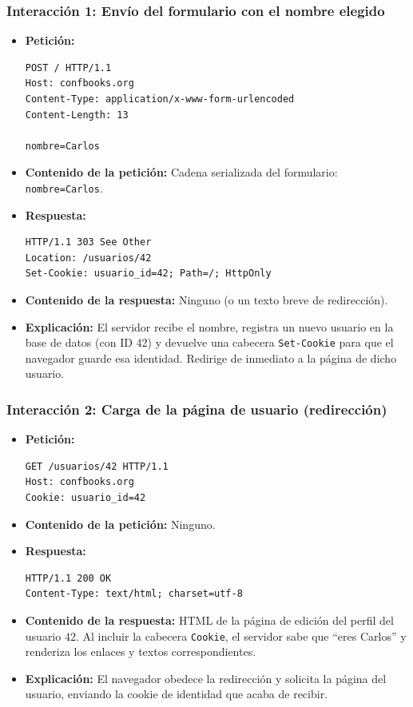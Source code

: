 \subsubsection*{Interacción 1: Envío del formulario con el nombre elegido}
\begin{itemize}
    \item \textbf{Petición:}
    \begin{verbatim}
POST / HTTP/1.1
Host: confbooks.org
Content-Type: application/x-www-form-urlencoded
Content-Length: 13

nombre=Carlos
    \end{verbatim}
    \item \textbf{Contenido de la petición:} Cadena serializada del formulario: \texttt{nombre=Carlos}.
    \item \textbf{Respuesta:}
    \begin{verbatim}
HTTP/1.1 303 See Other
Location: /usuarios/42
Set-Cookie: usuario_id=42; Path=/; HttpOnly
    \end{verbatim}
    \item \textbf{Contenido de la respuesta:} Ninguno (o un texto breve de redirección).
    \item \textbf{Explicación:} El servidor recibe el nombre, registra un nuevo usuario en la base de datos (con ID 42) y devuelve una cabecera \texttt{Set-Cookie} para que el navegador guarde esa identidad. Redirige de inmediato a la página de dicho usuario.
\end{itemize}

\subsubsection*{Interacción 2: Carga de la página de usuario (redirección)}
\begin{itemize}
    \item \textbf{Petición:}
    \begin{verbatim}
GET /usuarios/42 HTTP/1.1
Host: confbooks.org
Cookie: usuario_id=42
    \end{verbatim}
    \item \textbf{Contenido de la petición:} Ninguno.
    \item \textbf{Respuesta:}
    \begin{verbatim}
HTTP/1.1 200 OK
Content-Type: text/html; charset=utf-8
    \end{verbatim}
    \item \textbf{Contenido de la respuesta:} HTML de la página de edición del perfil del usuario 42. Al incluir la cabecera \texttt{Cookie}, el servidor sabe que ``eres Carlos'' y renderiza los enlaces y textos correspondientes.
    \item \textbf{Explicación:} El navegador obedece la redirección y solicita la página del usuario, enviando la cookie de identidad que acaba de recibir.
\end{itemize}

